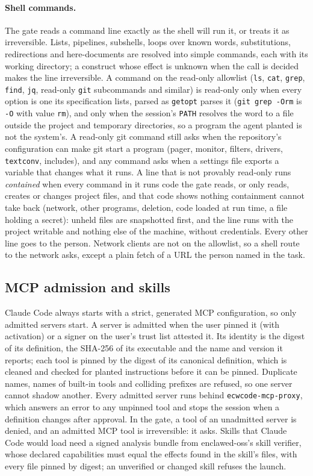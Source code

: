 \documentclass[11pt]{article}
\begin{document}
\paragraph{Shell commands.} The gate reads a command line exactly as the
shell will run it, or treats it as irreversible. Lists, pipelines,
subshells, loops over known words, substitutions, redirections and
here-documents are resolved into simple commands, each with its working
directory; a construct whose effect is unknown when the call is decided
makes the line irreversible. A command on the read-only allowlist
(\texttt{ls}, \texttt{cat}, \texttt{grep}, \texttt{find}, \texttt{jq},
read-only \texttt{git} subcommands and similar) is read-only only when
every option is one its specification lists, parsed as \texttt{getopt}
parses it (\texttt{git grep -Orm} is \texttt{-O} with value \texttt{rm}),
and only when the session's \texttt{PATH} resolves the word to a file
outside the project and temporary directories, so a program the agent
planted is not the system's. A read-only git command still asks when the
repository's configuration can make git start a program (pager,
monitor, filters, drivers, \texttt{textconv}, includes), and any command
asks when a settings file exports a variable that changes what it runs.
A line that is not provably read-only runs \emph{contained} when every
command in it runs code the gate reads, or only reads, creates or
changes project files, and that code shows nothing containment cannot
take back (network, other programs, deletion, code loaded at run time, a
file holding a secret): unheld files are snapshotted first, and the line
runs with the project writable and nothing else of the machine, without
credentials. Every other line goes to the person. Network clients are
not on the allowlist, so a shell route to the network asks, except a
plain fetch of a URL the person named in the task.

\subsection{MCP admission and skills}
\label{sec:mcp}

Claude Code always starts with a strict, generated MCP configuration, so
only admitted servers start. A server is admitted when the user pinned
it (with activation) or a signer on the user's trust list attested it.
Its identity is the digest of its definition, the SHA-256 of its
executable and the name and version it reports; each tool is pinned by
the digest of its canonical definition, which is cleaned and checked for
planted instructions before it can be pinned. Duplicate names, names of
built-in tools and colliding prefixes are refused, so one server cannot
shadow another. Every admitted server runs behind
\texttt{ecwcode-mcp-proxy}, which answers an error to any unpinned
tool and stops the session when a definition changes after approval. In
the gate, a tool of an unadmitted server is denied, and an admitted MCP
tool is irreversible: it asks. Skills that Claude Code would load need a
signed analysis bundle from enclawed-oss's skill verifier, whose
declared capabilities must equal the effects found in the skill's files,
with every file pinned by digest; an unverified or changed skill refuses
the launch.
\end{document}
